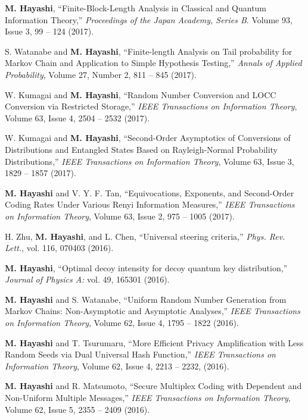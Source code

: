 \documentclass[a4paper,12pt,oneside]{article}
\begin{document}
\begin{enumerate}
\textbf{M. Hayashi}, ``Finite-Block-Length Analysis in Classical and Quantum Information Theory,'' 
{\em Proceedings of the Japan Academy, Series B}.
Volume 93, Issue 3, 99 -- 124 (2017).

S. Watanabe and \textbf{M. Hayashi}, ``Finite-length Analysis on Tail probability for Markov Chain and Application to Simple Hypothesis Testing,'' 
{\em Annals of Applied Probability},
Volume 27, Number 2, 811 -- 845 (2017).

W. Kumagai and \textbf{M. Hayashi}, ``Random Number Conversion and LOCC Conversion via Restricted Storage,'' 
{\em IEEE Transactions on Information Theory},
Volume 63, Issue 4, 2504 -- 2532 (2017). 

W. Kumagai and \textbf{M. Hayashi}, ``Second-Order Asymptotics of Conversions of Distributions and Entangled States Based on Rayleigh-Normal Probability Distributions,'' 
{\em IEEE Transactions on Information Theory}, Volume 63, Issue 3, 1829 -- 1857 (2017). 

\textbf{M. Hayashi} and V. Y. F. Tan, ``Equivocations, Exponents, and Second-Order Coding Rates Under Various Renyi Information Measures,'' 
{\em IEEE Transactions on Information Theory}, Volume 63, Issue 2, 975 -- 1005 (2017). 

H. Zhu, \textbf{M. Hayashi}, and L. Chen, ``Universal steering criteria,'' 
{\em Phys. Rev. Lett.}, vol. 116, 070403 (2016). 

\textbf{M. Hayashi}, 
``Optimal decoy intensity for decoy quantum key distribution,'' 
{\em Journal of Physics A:} vol. 49, 165301 (2016). 

\textbf{M. Hayashi} and S. Watanabe, ``Uniform Random Number Generation from Markov Chains: Non-Asymptotic and Asymptotic Analyses,'' 
{\em IEEE Transactions on Information Theory}, Volume 62, Issue 4, 1795 -- 1822 (2016). 

\textbf{M. Hayashi} and T. Tsurumaru, ``More Efficient Privacy Amplification with Less Random Seeds via Dual Universal Hash Function,'' 
{\em IEEE Transactions on Information Theory}, 
Volume 62, Issue 4, 2213 -- 2232, (2016). 

\textbf{M. Hayashi} and R. Matsumoto, ``Secure Multiplex Coding with Dependent and Non-Uniform Multiple Messages,'' 
{\em IEEE Transactions on Information Theory}, Volume 62, Issue 5, 2355 -- 2409 (2016). 


\end{enumerate}
\end{document}
